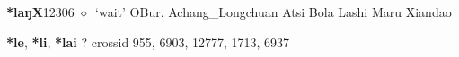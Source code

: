   \begin{list}{}{\leftmargin=1.5em \itemindent=-1.5em}
  \item {\footnotesize \textbf{*laŋX}}{\tiny 12306}
         $\diamond$~`wait'
         OBur. 
\hspace{1ex}
         Achang\_Longchuan 
\hspace{1ex}
         Atsi 
\hspace{1ex}
         Bola 
\hspace{1ex}
         Lashi 
\hspace{1ex}
         Maru 
\hspace{1ex}
         Xiandao 
  \end{list}
\item
\textbf{*le}, \textbf{*li}, \textbf{*lai}
?
  {\tiny crossid 955, 6903, 12777, 1713, 6937}
